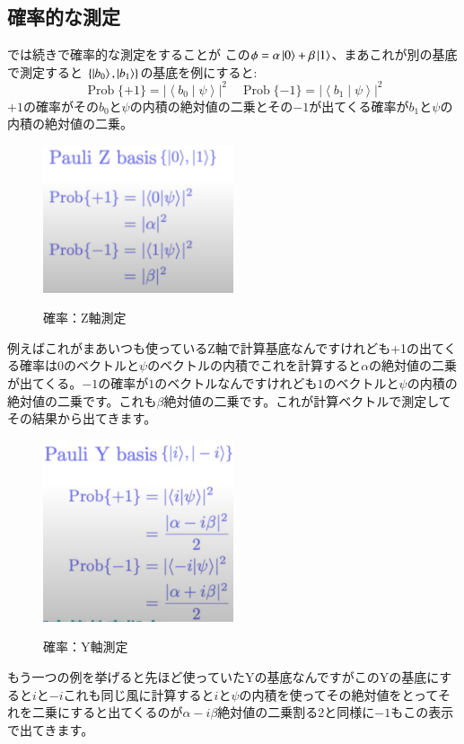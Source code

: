 \subsection{確率的な測定}
では続きで確率的な測定をすることが
この$\phi=\alpha\ket{0}+\beta\ket{1}$、まあこれが別の基底で測定すると
$\{\ket{b_0}, \ket{b_1}\}$の基底を例にすると:
\begin{equation}
\operatorname{Prob}\{+1\}=\left|\left\langle b_{0} \mid \psi\right\rangle\right|^{2} \quad \operatorname{Prob}\{-1\}=\left|\left\langle b_{1} \mid \psi\right\rangle\right|^{2}
\end{equation}
$+1$の確率がその$b_0$と$\psi$の内積の絶対値の二乗とその$-1$が出てくる確率が$b_1$と$\psi$の内積の絶対値の二乗。
\begin{figure}[H]
    \centering
    \includegraphics[width=0.5\textwidth]{lesson2/Pauli_z_ex.pdf}
    \label{fig: 1}
    \begin{center}
        \caption{確率：Z軸測定}
    \end{center}
\end{figure}
例えばこれがまあいつも使っているZ軸で計算基底なんですけれども+1の出てくる確率は$0$のベクトルと$\psi$のベクトルの内積でこれを計算すると$\alpha$の絶対値の二乗が出てくる。$-1$の確率が$1$のベクトルなんですけれども$1$のベクトルと$\psi$の内積の絶対値の二乗です。これも$\beta$絶対値の二乗です。これが計算ベクトルで測定してその結果から出てきます。
\begin{figure}[H]
    \centering
    \includegraphics[width=0.5\textwidth]{lesson2/Pauli_y_ex.pdf}
    \label{fig: 1}
    \begin{center}
        \caption{確率：Y軸測定}
    \end{center}
\end{figure}
もう一つの例を挙げると先ほど使っていたYの基底なんですがこのYの基底にすると$i$と$-i$これも同じ風に計算すると$i$と$\psi$の内積を使ってその絶対値をとってそれを二乗にすると出てくるのが$\alpha-i\beta$絶対値の二乗割る2と同様に$-1$もこの表示で出てきます。


